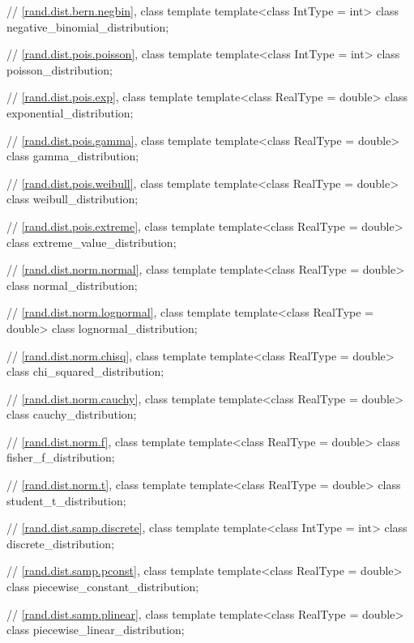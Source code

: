 \begin{codeblock}
{  // \ref{rand.dist.bern.negbin}, class template 
  template<class IntType = int>
    class negative_binomial_distribution;

  // \ref{rand.dist.pois.poisson}, class template 
  template<class IntType = int>
    class poisson_distribution;

  // \ref{rand.dist.pois.exp}, class template 
  template<class RealType = double>
    class exponential_distribution;

  // \ref{rand.dist.pois.gamma}, class template 
  template<class RealType = double>
    class gamma_distribution;

  // \ref{rand.dist.pois.weibull}, class template 
  template<class RealType = double>
    class weibull_distribution;

  // \ref{rand.dist.pois.extreme}, class template 
  template<class RealType = double>
    class extreme_value_distribution;

  // \ref{rand.dist.norm.normal}, class template 
  template<class RealType = double>
    class normal_distribution;

  // \ref{rand.dist.norm.lognormal}, class template 
  template<class RealType = double>
    class lognormal_distribution;

  // \ref{rand.dist.norm.chisq}, class template 
  template<class RealType = double>
    class chi_squared_distribution;

  // \ref{rand.dist.norm.cauchy}, class template 
  template<class RealType = double>
    class cauchy_distribution;

  // \ref{rand.dist.norm.f}, class template 
  template<class RealType = double>
    class fisher_f_distribution;

  // \ref{rand.dist.norm.t}, class template 
  template<class RealType = double>
    class student_t_distribution;

  // \ref{rand.dist.samp.discrete}, class template 
  template<class IntType = int>
    class discrete_distribution;

  // \ref{rand.dist.samp.pconst}, class template 
  template<class RealType = double>
    class piecewise_constant_distribution;

  // \ref{rand.dist.samp.plinear}, class template 
  template<class RealType = double>
    class piecewise_linear_distribution;
}
\end{codeblock}%
%


